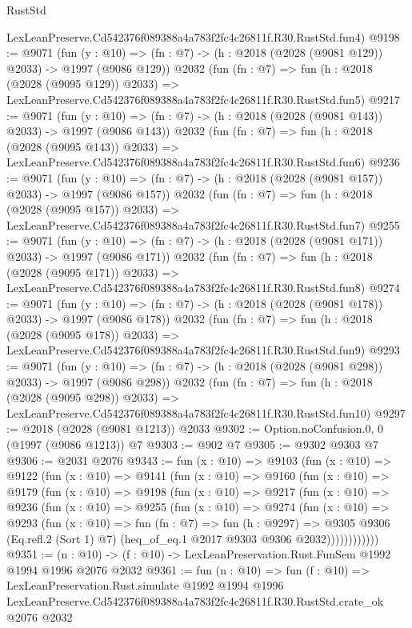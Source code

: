 \begin{lexlean}{RustStd}
\begin{coremodule}
    LexLeanPreserve.Cd542376f089388a4a783f2fc4c26811f.R30.RustStd.fun4)
@9198 := @9071
    (fun (y : @10) => (fn : @7) -> (h : @2018 (@2028 (@9081 @129)) @2033) -> @1997 (@9086 @129))
    @2032
    (fun (fn : @7) =>
    fun (h : @2018 (@2028 (@9095 @129)) @2033) =>
    LexLeanPreserve.Cd542376f089388a4a783f2fc4c26811f.R30.RustStd.fun5)
@9217 := @9071
    (fun (y : @10) => (fn : @7) -> (h : @2018 (@2028 (@9081 @143)) @2033) -> @1997 (@9086 @143))
    @2032
    (fun (fn : @7) =>
    fun (h : @2018 (@2028 (@9095 @143)) @2033) =>
    LexLeanPreserve.Cd542376f089388a4a783f2fc4c26811f.R30.RustStd.fun6)
@9236 := @9071
    (fun (y : @10) => (fn : @7) -> (h : @2018 (@2028 (@9081 @157)) @2033) -> @1997 (@9086 @157))
    @2032
    (fun (fn : @7) =>
    fun (h : @2018 (@2028 (@9095 @157)) @2033) =>
    LexLeanPreserve.Cd542376f089388a4a783f2fc4c26811f.R30.RustStd.fun7)
@9255 := @9071
    (fun (y : @10) => (fn : @7) -> (h : @2018 (@2028 (@9081 @171)) @2033) -> @1997 (@9086 @171))
    @2032
    (fun (fn : @7) =>
    fun (h : @2018 (@2028 (@9095 @171)) @2033) =>
    LexLeanPreserve.Cd542376f089388a4a783f2fc4c26811f.R30.RustStd.fun8)
@9274 := @9071
    (fun (y : @10) => (fn : @7) -> (h : @2018 (@2028 (@9081 @178)) @2033) -> @1997 (@9086 @178))
    @2032
    (fun (fn : @7) =>
    fun (h : @2018 (@2028 (@9095 @178)) @2033) =>
    LexLeanPreserve.Cd542376f089388a4a783f2fc4c26811f.R30.RustStd.fun9)
@9293 := @9071
    (fun (y : @10) => (fn : @7) -> (h : @2018 (@2028 (@9081 @298)) @2033) -> @1997 (@9086 @298))
    @2032
    (fun (fn : @7) =>
    fun (h : @2018 (@2028 (@9095 @298)) @2033) =>
    LexLeanPreserve.Cd542376f089388a4a783f2fc4c26811f.R30.RustStd.fun10)
@9297 := @2018 (@2028 (@9081 @1213)) @2033
@9302 := Option.noConfusion.{0, 0} (@1997 (@9086 @1213)) @7
@9303 := @902 @7
@9305 := @9302 @9303 @7
@9306 := @2031 @2076
@9343 := fun (x : @10) =>
  @9103
    (fun (x : @10) =>
    @9122
      (fun (x : @10) =>
      @9141
        (fun (x : @10) =>
        @9160
          (fun (x : @10) =>
          @9179
            (fun (x : @10) =>
            @9198
              (fun (x : @10) =>
              @9217
                (fun (x : @10) =>
                @9236
                  (fun (x : @10) =>
                  @9255
                    (fun (x : @10) =>
                    @9274
                      (fun (x : @10) =>
                      @9293
                        (fun (x : @10) =>
                        fun (fn : @7) =>
                        fun (h : @9297) =>
                        @9305
                          @9306
                          (Eq.refl.{2} (Sort 1) @7)
                          (heq_of_eq.{1} @2017 @9303 @9306 @2032))))))))))))
@9351 := (n : @10) -> (f : @10) -> LexLeanPreservation.Rust.FunSem @1992 @1994 @1996 @2076 @2032
@9361 := fun (n : @10) =>
  fun (f : @10) =>
  LexLeanPreservation.Rust.simulate
    @1992
    @1994
    @1996
    LexLeanPreserve.Cd542376f089388a4a783f2fc4c26811f.R30.RustStd.crate_ok
    @2076
    @2032
\end{coremodule}
\end{lexlean}
